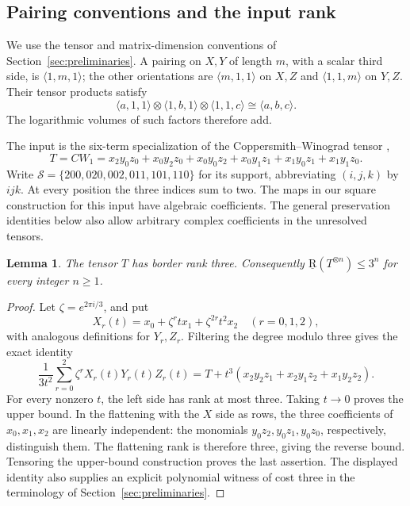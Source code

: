 \documentclass[11pt]{article}
\numberwithin{equation}{section}
\newtheorem{lemma}[theorem]{Lemma}
\theoremstyle{definition}
\theoremstyle{remark}
\begin{document}
\subsection{Pairing conventions and the input rank}
\label{alg:conventions}

We use the tensor and matrix-dimension conventions of
Section~\ref{sec:preliminaries}.
A pairing on \(X,Y\) of length \(m\), with a scalar third side, is
\(\langle1,m,1\rangle\); the other orientations are
\(\langle m,1,1\rangle\) on \(X,Z\) and
\(\langle1,1,m\rangle\) on \(Y,Z\).
Their tensor products satisfy
\begin{equation}
 \langle a,1,1\rangle\otimes\langle1,b,1\rangle
 \otimes\langle1,1,c\rangle\cong\langle a,b,c\rangle.
 \label{alg:pairing-product}
\end{equation}
The logarithmic volumes of such factors therefore add.

The input is the six-term specialization of the Coppersmith--Winograd
tensor \citep[Section~7, equation~(10)]{cw},
\begin{equation}
 T=CW_1=x_2y_0z_0+x_0y_2z_0+x_0y_0z_2
        +x_0y_1z_1+x_1y_0z_1+x_1y_1z_0.
 \label{alg:cw}
\end{equation}
Write
\(\mathcal S=\{200,020,002,011,101,110\}\) for its support, abbreviating
\((i,j,k)\) by \(ijk\).  At every position the three indices sum to two.
The maps in our square construction for this input have algebraic
coefficients.  The general preservation identities below also allow
arbitrary complex coefficients in the unresolved tensors.

\begin{lemma}
\label{alg:cw-rank}
The tensor \(T\) has border rank three.  Consequently
\(\operatorname{\underline R}(T^{\otimes n})\leq3^n\) for every integer \(n\geq1\).
\end{lemma}
\begin{proof}
Let \(\zeta=e^{2\pi i/3}\), and put
\[
 X_r(t)=x_0+\zeta^r t x_1+\zeta^{2r}t^2x_2
 \quad (r=0,1,2),
\]
with analogous definitions for \(Y_r,Z_r\).  Filtering the degree modulo
three gives the exact identity
\[
 \frac{1}{3t^2}\sum_{r=0}^2\zeta^r X_r(t)Y_r(t)Z_r(t)
 =T+t^3(x_2y_2z_1+x_2y_1z_2+x_1y_2z_2).
\]
For every nonzero \(t\), the left side has rank at most three.  Taking
\(t\to0\) proves the upper bound.  In the flattening with the \(X\) side
as rows, the three coefficients of \(x_0,x_1,x_2\) are linearly independent:
the monomials \(y_0z_2,y_0z_1,y_0z_0\), respectively, distinguish them.
The flattening rank is therefore three, giving the reverse bound.  Tensoring
the upper-bound construction proves the last assertion.
The displayed identity also supplies an explicit polynomial witness of
cost three in the terminology of Section~\ref{sec:preliminaries}.
\end{proof}
\end{document}
